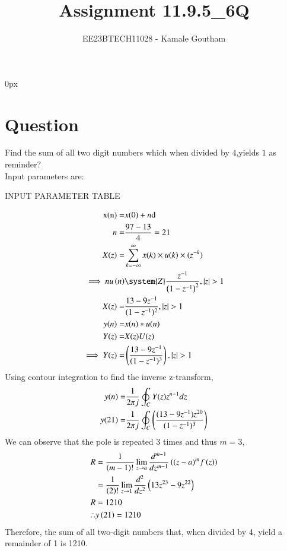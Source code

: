 \documentclass[journal,12pt,twocolumn]{IEEEtran}
\theoremstyle{remark}
\begin{document}
\parindent 0px

\title{Assignment 11.9.5\_6Q}
\author{EE23BTECH11028 - Kamale Goutham$^{}$%
}
\maketitle
\newpage
\bigskip
\section*{Question}
Find the sum of all two digit numbers which when divided by $4$,yields $1$ as reminder?\\
\solution 
Input parameters are:\\
\begin{table}[ht]
    \centering
    \def\arraystretch{1.5}
    
    \caption{INPUT PARAMETER TABLE}
    \label{tab:11.9.5.6}
\end{table}
  \begin{align}
    \text{x(n)}=&x(0)+n{\text{d}}\\
    n=&\frac{97-13}{4}=21\\
X(z)=&\sum\limits^{\infty}_{k=-\infty}{x(k)\times u(k)\times(z^{-k}})\\
\implies    n u\brak{n} & \system{Z} \frac{z^{-1}}{\brak{1-z^{-1}}^2} ,   \abs{z} >1 \\
X(z)=&\frac{13-9z^{-1}}{(1-z^{-1})^2},|z|>1\\
y(n)=&x(n)*u(n)\\ Y(z)=&X(z)U(z)\\\implies Y(z)=&\brak{\frac{13-9z^{-1}}{(1-z^{-1})^{3}}},|z|>1
\end{align}
Using contour integration to find the inverse z-transform,
\begin{align}
    y(n)=&\frac{1}{2\pi j}\oint_{C}Y(z) z^{n-1} dz  \\y(21)=&\frac{1}{2\pi j}\oint_{C}\left(\frac{(13-9z^{-1})z^{20}}{(1-z^{-1})^{3}}\right)
\end{align}
We can observe that the pole is repeated $3$ times and thus $m=3$,
\begin{align}
    R&=\frac{1}{\left(m-1\right)!}\lim\limits_{z\to a}\frac{d^{m-1}}{dz^{m-1}}\left({(z-a)}^{m}f\left(z\right)\right)  \\&=\frac{1}{\left(2\right)!}\lim\limits_{z\to 1}\frac{d^{2}}{dz^{2}}\left(13z^{23}-9z^{22}\right)\\R&=1210\\
        \therefore &y\left(21\right)=1210
\end{align}
Therefore, the sum of all two-digit numbers that, when divided by 4, yield a remainder of 1 is 1210.\\
\end{document}
